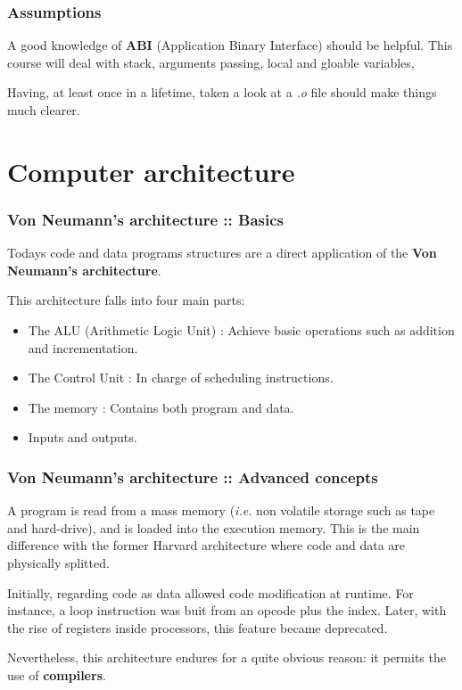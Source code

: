 
\begin{frame}
  \frametitle{Assumptions}

  A good knowledge of \textbf{ABI} (Application Binary Interface) should be helpful. This
  course will deal with stack, arguments passing, local and gloable variables,
  \etc{}

  \-

  Having, at least once in a lifetime, taken a look at a \textit{.o} file should make things much
  clearer.
\end{frame}



%
%

\section{Computer architecture}


\begin{frame}
  \frametitle{Von Neumann's architecture :: Basics}

  Todays code and data programs structures are a direct application of the \textbf{Von Neumann's architecture}.

  \-

  This architecture falls into four main parts:

  \begin{itemize}
    \item
      The ALU (Arithmetic Logic Unit) : Achieve basic operations such as addition and incrementation.
    \item
      The Control Unit : In charge of scheduling instructions.
    \item
      The memory : Contains both program and data.
    \item
      Inputs and outputs.
  \end{itemize}

\end{frame}


\begin{frame}
  \frametitle{Von Neumann's architecture :: Advanced concepts}

A program is read from a mass memory (\textit{i.e.} non volatile storage such as
tape and hard-drive), and is loaded into the execution memory. This is
the main difference with the former Harvard architecture where code and
data are physically splitted.

\-

Initially, regarding code as data allowed code modification at runtime. For
instance, a loop instruction was buit from an opcode plus the index. Later,
with the rise of registers inside processors, this feature became
deprecated.

\-

Nevertheless, this architecture endures for a quite obvious reason: it
permits the use of \textbf{compilers}.

\end{frame}




